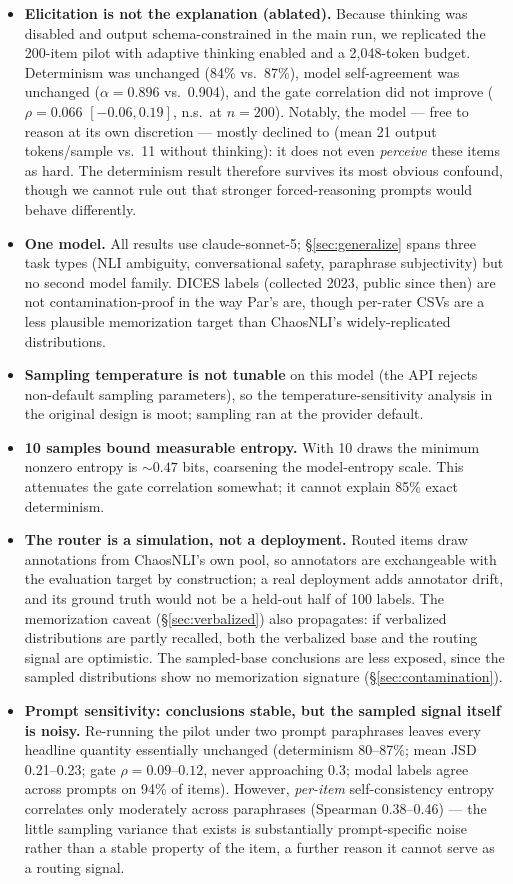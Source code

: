 \documentclass[11pt]{article}
\begin{document}
\begin{itemize}
\item \textbf{Elicitation is not the explanation (ablated).} Because thinking was disabled and output schema-constrained in the main run, we replicated the 200-item pilot with adaptive thinking enabled and a 2,048-token budget. Determinism was unchanged (84\% vs.\ 87\%), model self-agreement was unchanged ($\alpha = 0.896$ vs.\ 0.904), and the gate correlation did not improve ($\rho = 0.066$ $[-0.06, 0.19]$, n.s.\ at $n = 200$). Notably, the model --- free to reason at its own discretion --- mostly declined to (mean 21 output tokens/sample vs.\ 11 without thinking): it does not even \emph{perceive} these items as hard. The determinism result therefore survives its most obvious confound, though we cannot rule out that stronger forced-reasoning prompts would behave differently.
\item \textbf{One model.} All results use claude-sonnet-5; \S\ref{sec:generalize} spans three task types (NLI ambiguity, conversational safety, paraphrase subjectivity) but no second model family. DICES labels (collected 2023, public since then) are not contamination-proof in the way Par's are, though per-rater CSVs are a less plausible memorization target than ChaosNLI's widely-replicated distributions.
\item \textbf{Sampling temperature is not tunable} on this model (the API rejects non-default sampling parameters), so the temperature-sensitivity analysis in the original design is moot; sampling ran at the provider default.
\item \textbf{10 samples bound measurable entropy.} With 10 draws the minimum nonzero entropy is ${\sim}0.47$ bits, coarsening the model-entropy scale. This attenuates the gate correlation somewhat; it cannot explain 85\% exact determinism.
\item \textbf{The router is a simulation, not a deployment.} Routed items draw annotations from ChaosNLI's own pool, so annotators are exchangeable with the evaluation target by construction; a real deployment adds annotator drift, and its ground truth would not be a held-out half of 100 labels. The memorization caveat (\S\ref{sec:verbalized}) also propagates: if verbalized distributions are partly recalled, both the verbalized base and the routing signal are optimistic. The sampled-base conclusions are less exposed, since the sampled distributions show no memorization signature (\S\ref{sec:contamination}).
\item \textbf{Prompt sensitivity: conclusions stable, but the sampled signal itself is noisy.} Re-running the pilot under two prompt paraphrases leaves every headline quantity essentially unchanged (determinism 80--87\%; mean JSD 0.21--0.23; gate $\rho = 0.09$--$0.12$, never approaching 0.3; modal labels agree across prompts on 94\% of items). However, \emph{per-item} self-consistency entropy correlates only moderately across paraphrases (Spearman 0.38--0.46) --- the little sampling variance that exists is substantially prompt-specific noise rather than a stable property of the item, a further reason it cannot serve as a routing signal.
\end{itemize}
\end{document}
